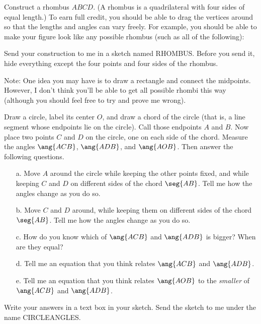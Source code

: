 \begin{SA} \label{rhombus}
Construct a rhombus $ABCD$.  (A rhombus is a quadrilateral with
four sides of equal length.)  To earn full credit, you should
be able to drag the vertices around so that the lengths and angles
can vary freely.  For example, you should be able to make your figure
look like any possible rhombus (such as all of the following):


Send your construction to me in a sketch named RHOMBUS.  Before you 
send it,
hide everything except the four points and four sides of the rhombus.

Note: One idea you may have is to draw a rectangle and connect the midpoints.
However, I don't think you'll be able to get all possible rhombi
this way (although you should feel free to try and prove me wrong).
\end{SA}

\begin{SA}
Draw a circle, label its center $O$, and draw a chord of the circle
(that is, a line segment whose endpoints lie on the circle).  Call those
endpoints $A$ and $B$.  Now place two points $C$ and $D$ on the circle, 
one on each side of the chord.  Measure the angles $\ang{ACB}$, 
$\ang{ADB}$, and $\ang{AOB}$.  Then answer the following 
questions.

\begin{enumerate}

\item[a.] Move $A$ around the circle while keeping the other 
points fixed, and while keeping $C$ and $D$ on different sides of the 
chord $\seg{AB}$.  Tell me how the angles change as you do so.

\item[b.] Move $C$ and $D$ around, while keeping them on different sides 
of the chord $\seg{AB}$.  Tell me how the angles change as you do so.

\item[c.] How do you know which of $\ang{ACB}$ and $\ang{ADB}$ is bigger?
When are they equal?

\item[d.] Tell me an equation that you think relates
$\ang{ACB}$ and $\ang{ADB}$.

\item[e.] Tell me an equation that you think relates
$\ang{AOB}$ to the \emph{smaller} of $\ang{ACB}$ and $\ang{ADB}$.

\end{enumerate}

Write your answers in a text box in your sketch.  Send the sketch
to me under the name CIRCLEANGLES.
\end{SA}

